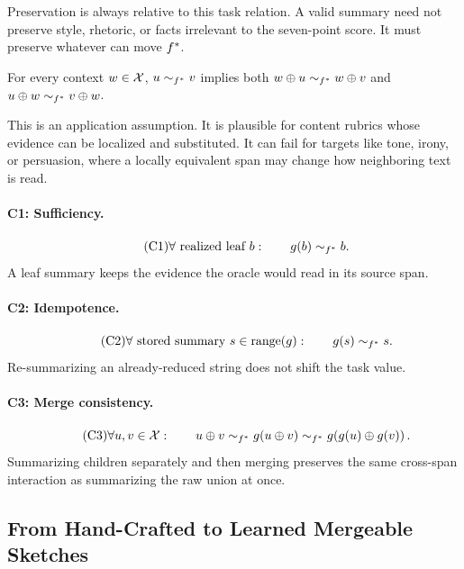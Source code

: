 Preservation is always relative to this task relation. A valid summary
need not preserve style, rhetoric, or facts irrelevant to the
seven-point score. It must preserve whatever can move $f^\ast$.

\begin{assumption}\label{ass:context}
For every context $w\in\mathcal{X}$, $u\sim_{f^\ast}v$ implies both
$w\oplus u\sim_{f^\ast}w\oplus v$ and
$u\oplus w\sim_{f^\ast}v\oplus w$.
\end{assumption}

This is an application assumption. It is plausible for content rubrics
whose evidence can be localized and substituted. It can fail for
targets like tone, irony, or persuasion, where a locally equivalent
span may change how neighboring text is read.

\paragraph{C1: Sufficiency.}
\begin{equation}\tag{C1}\label{eq:leaf_sufficiency}
  \forall\text{ realized leaf }b:\qquad g(b)\sim_{f^\ast}b.
\end{equation}
A leaf summary keeps the evidence the oracle would read in its source
span.

\paragraph{C2: Idempotence.}
\begin{equation}\tag{C2}\label{eq:leaf_idempotence}
  \forall\text{ stored summary }s\in\operatorname{range}(g):\qquad
  g(s)\sim_{f^\ast}s.
\end{equation}
Re-summarizing an already-reduced string does not shift the task value.

\paragraph{C3: Merge consistency.}
\begin{equation}\tag{C3}\label{eq:leaf_compatibility}
  \forall u,v\in\mathcal{X}:\qquad
  u\oplus v
  \sim_{f^\ast}g(u\oplus v)
  \sim_{f^\ast}g\!\left(g(u)\oplus g(v)\right).
\end{equation}
Summarizing children separately and then merging preserves the same
cross-span interaction as summarizing the raw union at once.

\subsection{From Hand-Crafted to Learned Mergeable Sketches}\label{sec:min-sketch-reduction}

